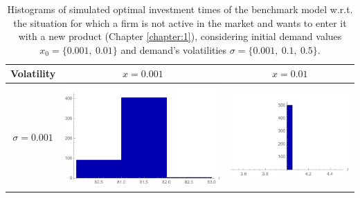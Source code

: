 \begin{table}[!htb]
	\caption{Histograms of simulated optimal investment times of the benchmark model w.r.t. the situation for which a firm is not active in the market and wants to enter it with a new product (Chapter \ref{chapter:1}), considering initial demand values $x_0=\{0.001,\ 0.01\}$ and demand's volatilities $\sigma=\{0.001, \ 0.1, \ 0.5 \}$.}
	\begin{tabular}{c|c|c}
		\hline
		Volatility & $x=0.001$ & $x=0.01$ \\ \hline
		$\sigma=0.001$ & \begin{minipage}{.45\textwidth}
			\includegraphics[width=\linewidth]{StopTime/x001o001.pdf}
		\end{minipage}
		& \begin{minipage}{.45\textwidth}
			\includegraphics[width=\linewidth]{StopTime/x01o001.pdf}

\end{minipage}
\end{tabular}
\end{table}

